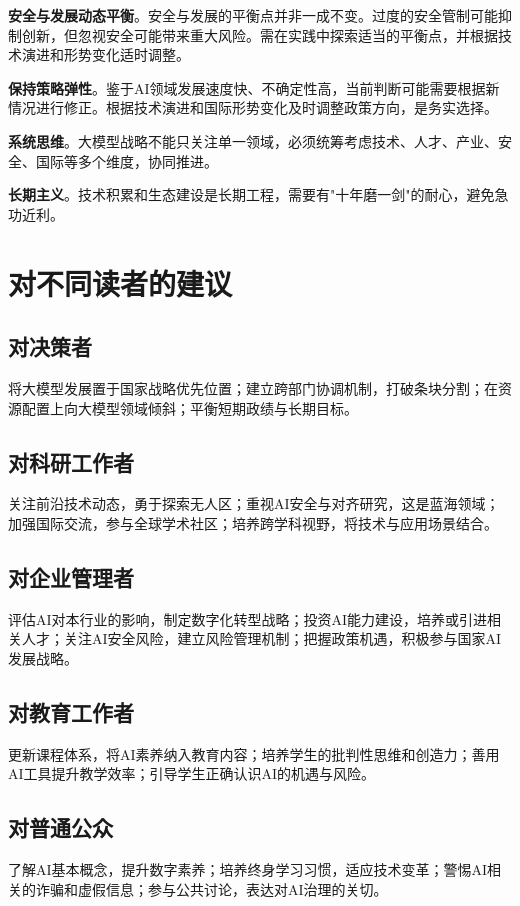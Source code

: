 \textbf{安全与发展动态平衡}。安全与发展的平衡点并非一成不变。过度的安全管制可能抑制创新，但忽视安全可能带来重大风险。需在实践中探索适当的平衡点，并根据技术演进和形势变化适时调整。

\textbf{保持策略弹性}。鉴于AI领域发展速度快、不确定性高，当前判断可能需要根据新情况进行修正。根据技术演进和国际形势变化及时调整政策方向，是务实选择。

\textbf{系统思维}。大模型战略不能只关注单一领域，必须统筹考虑技术、人才、产业、安全、国际等多个维度，协同推进。

\textbf{长期主义}。技术积累和生态建设是长期工程，需要有"十年磨一剑"的耐心，避免急功近利。

\section{对不同读者的建议}

\subsection{对决策者}
将大模型发展置于国家战略优先位置；建立跨部门协调机制，打破条块分割；在资源配置上向大模型领域倾斜；平衡短期政绩与长期目标。

\subsection{对科研工作者}
关注前沿技术动态，勇于探索无人区；重视AI安全与对齐研究，这是蓝海领域；加强国际交流，参与全球学术社区；培养跨学科视野，将技术与应用场景结合。

\subsection{对企业管理者}
评估AI对本行业的影响，制定数字化转型战略；投资AI能力建设，培养或引进相关人才；关注AI安全风险，建立风险管理机制；把握政策机遇，积极参与国家AI发展战略。

\subsection{对教育工作者}
更新课程体系，将AI素养纳入教育内容；培养学生的批判性思维和创造力；善用AI工具提升教学效率；引导学生正确认识AI的机遇与风险。

\subsection{对普通公众}
了解AI基本概念，提升数字素养；培养终身学习习惯，适应技术变革；警惕AI相关的诈骗和虚假信息；参与公共讨论，表达对AI治理的关切。

